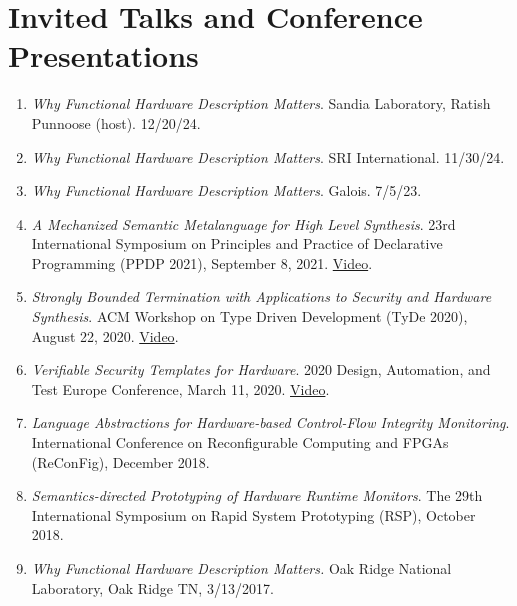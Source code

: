 \documentclass[12pt]{article} %
\begin{document}


\section*{Invited Talks and Conference Presentations}

\begin{enumerate}[leftmargin=0mm]

\item{\it Why Functional Hardware Description Matters}. Sandia Laboratory, Ratish Punnoose (host). 12/20/24.

\item{\it Why Functional Hardware Description Matters}. SRI International. 11/30/24.

\item{\it Why Functional Hardware Description Matters}. Galois. 7/5/23.



\item{\it A Mechanized Semantic Metalanguage for High Level Synthesis}. 23rd International Symposium on Principles and Practice of Declarative Programming (PPDP 2021), September 8, 2021. \href{https://www.youtube.com/watch?v=fZYWlE5XR_Y}{Video}.

\item{\it Strongly Bounded Termination with Applications to Security and Hardware Synthesis}. ACM Workshop on Type Driven Development (TyDe 2020), August 22, 2020. \href{https://www.youtube.com/watch?v=IQ2Xp4mWBIk}{Video}.

\item{\it Verifiable Security Templates for Hardware}. 2020 Design, Automation, and Test Europe Conference, March 11, 2020. \href{https://www.youtube.com/watch?v=EOCoqE7PZNs}{Video}.

\item{\it Language Abstractions for Hardware-based Control-Flow Integrity Monitoring}.  International Conference on Reconfigurable Computing and FPGAs (ReConFig), December 2018.

\item{\it Semantics-directed Prototyping of Hardware Runtime Monitors}. The 29th International Symposium on Rapid System Prototyping (RSP), October 2018.

\item{\it Why Functional Hardware Description Matters.}
Oak Ridge National Laboratory, Oak Ridge TN, 3/13/2017.



\end{enumerate}
\end{document}
